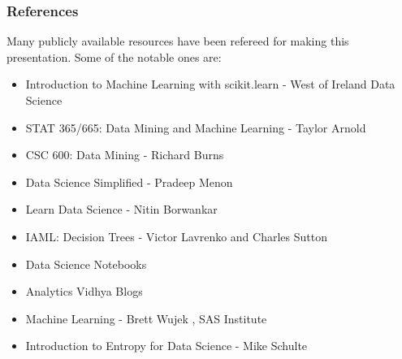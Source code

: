 \begin{frame}\frametitle{References}

Many publicly available resources have been refereed for making this presentation. Some of the notable ones are:
\footnotesize
\begin{itemize}
\item Introduction to Machine Learning with scikit.learn - West of Ireland Data Science
\item STAT 365/665: Data Mining and Machine Learning - Taylor Arnold
\item CSC 600: Data Mining - Richard Burns
\item Data Science Simplified - Pradeep Menon %
\item Learn Data Science - Nitin Borwankar %
\item IAML: Decision Trees	- Victor Lavrenko and Charles Sutton	
\item Data Science Notebooks %
\item Analytics Vidhya Blogs %
\item Machine Learning - Brett Wujek , SAS Institute
\item Introduction to Entropy for Data Science - Mike Schulte
\end{itemize}
\end{frame}
